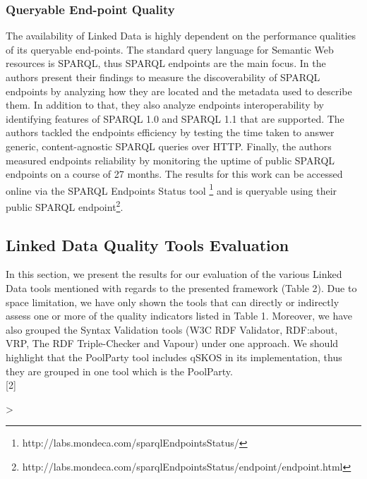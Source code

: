 \documentclass[onecolumn, crcready]{iosart2c}
\begin{document}
\subsubsection{Queryable End-point Quality}
The availability of Linked Data is highly dependent on the performance qualities of its queryable end-points. The standard query language for Semantic Web resources is SPARQL, thus SPARQL endpoints are the main focus. In \cite{Buil-Aranda2013} the authors present their findings to measure the discoverability of SPARQL endpoints by analyzing how they are located and the metadata used to describe them. In addition to that, they also analyze endpoints interoperability by identifying features of SPARQL 1.0 and SPARQL 1.1 that are supported. The authors tackled the endpoints efficiency by testing the time taken to answer generic, content-agnostic SPARQL queries over HTTP. Finally, the authors measured endpoints reliability by monitoring the uptime of public SPARQL endpoints on a course of 27 months. The results for this work can be accessed online via the SPARQL Endpoints Status tool \footnote{http://labs.mondeca.com/sparqlEndpointsStatus/} and is queryable using their public SPARQL endpoint\footnote{http://labs.mondeca.com/sparqlEndpointsStatus/endpoint/endpoint.html}. \\

\subsection{Linked Data Quality Tools Evaluation}
In this section, we present the results for our evaluation of the various Linked Data tools mentioned with regards to the presented framework (Table 2). Due to space limitation, we have only shown the tools that can directly or indirectly assess one or more of the quality indicators listed in Table 1. Moreover, we have also grouped the Syntax Validation tools (W3C RDF Validator, RDF:about, VRP, The RDF Triple-Checker and Vapour) under one approach. We should highlight that the PoolParty tool includes qSKOS in its implementation, thus they are grouped in one tool which is the PoolParty.\\

\newcolumntype{P}[2]{%
  >{\begin{turn}{#1}\begin{minipage}{#2}\small\raggedright\hspace{0pt}}l%
  <{\end{minipage}\end{turn}}%
}
\end{document}

